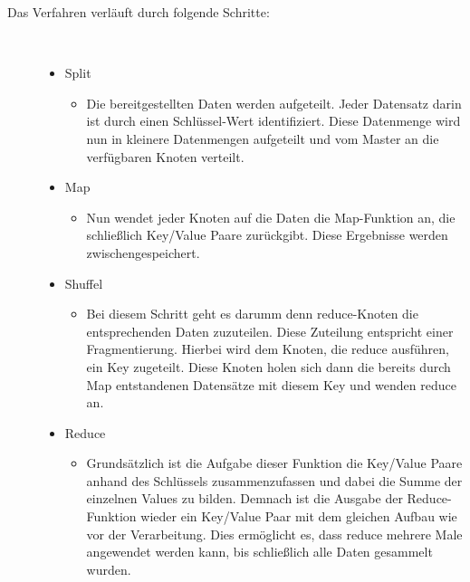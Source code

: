 \documentclass[a4paper,12pt]{article}
\begin{document}
\begin{description}
    \item[Das Verfahren verläuft durch folgende Schritte:] ~\par
    \begin{itemize}
        \item Split
        \begin{itemize}
            \item{Die bereitgestellten Daten werden aufgeteilt. Jeder Datensatz darin ist durch
            einen Schlüssel-Wert identifiziert. Diese Datenmenge wird nun in kleinere Datenmengen aufgeteilt
            und vom Master an die verfügbaren Knoten verteilt.}
        \end{itemize}
        \item Map 
        \begin{itemize}
            \item{Nun wendet jeder Knoten auf die Daten die Map-Funktion an, die schließlich Key/Value Paare zurückgibt. Diese Ergebnisse werden zwischengespeichert.}
        \end{itemize}
        \item Shuffel
        \begin{itemize}
            \item{Bei diesem Schritt geht es darumm denn reduce-Knoten die entsprechenden Daten zuzuteilen.
            Diese Zuteilung entspricht einer Fragmentierung.
            Hierbei wird dem Knoten, die reduce ausführen, ein Key zugeteilt. Diese Knoten holen sich
            dann die bereits durch Map entstandenen Datensätze mit diesem Key und wenden reduce an.}
        \end{itemize}
        \item Reduce
        \begin{itemize}
            \item{Grundsätzlich ist die Aufgabe dieser Funktion die Key/Value Paare anhand des Schlüssels
            zusammenzufassen und dabei die Summe der einzelnen Values zu bilden. Demnach ist die
            Ausgabe der Reduce-Funktion wieder ein Key/Value Paar mit dem gleichen Aufbau wie vor
            der Verarbeitung.
            Dies ermöglicht es, dass reduce mehrere Male angewendet werden kann, bis schließlich alle
            Daten gesammelt wurden.}
        \end{itemize}
    \end{itemize} 
\end{description}
\end{document}

